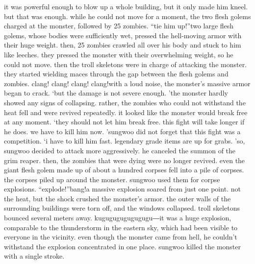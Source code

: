  it was powerful enough to blow up a whole building, but it only made him kneel.
but that was enough.
while he could not move for a moment, the two flesh golems charged at the monster, followed by 25 zombies.
“tie him up!”two large flesh golems, whose bodies were sufficiently wet, pressed the hell-moving armor with their huge weight.
 then, 25 zombies crawled all over his body and stuck to him like leeches.
 they pressed the monster with their overwhelming weight, so he could not move.
then the troll skeletons were in charge of attacking the monster.
 they started wielding maces through the gap between the flesh golems and zombies.
clang! clang! clang! clang!with a loud noise, the monster’s massive armor began to crack.
‘but the damage is not severe enough.
’the monster hardly showed any signs of collapsing.
 rather, the zombies who could not withstand the heat fell and were revived repeatedly.
 it looked like the monster would break free at any moment.
‘they should not let him break free.
 this fight will take longer if he does.
 we have to kill him now.
’sungwoo did not forget that this fight was a competition.
‘i have to kill him fast.
 legendary grade items are up for grabs.
’so, sungwoo decided to attack more aggressively.
he canceled the summon of the grim reaper.
then, the zombies that were dying were no longer revived.
 even the giant flesh golem made up of about a hundred corpses fell into a pile of corpses.
 the corpses piled up around the monster.
 sungwoo used them for corpse explosions.
“explode!”bang!a massive explosion soared from just one point.
 not the heat, but the shock crushed the monster’s armor.
 the outer walls of the surrounding buildings were torn off, and the windows collapsed.
 troll skeletons bounced several meters away.
kugugugugugugugu―it was a huge explosion, comparable to the thunderstorm in the eastern sky, which had been visible to everyone in the vicinity.
even though the monster came from hell, he couldn’t withstand the explosion concentrated in one place.
sungwoo killed the monster with a single stroke.


